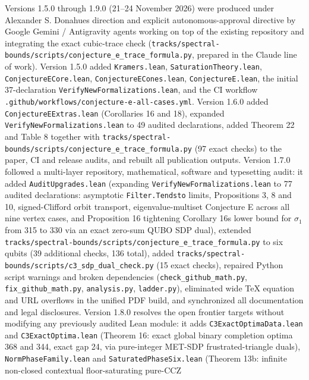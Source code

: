 \documentclass[11pt,a4paper]{article}
\begin{document}
Versions 1.5.0 through 1.9.0 (21--24 November 2026) were produced under Alexander S. Donahue\textquotesingle s direction and
explicit autonomous-approval directive by Google Gemini / Antigravity agents working on top of the
existing repository and integrating the exact cubic-trace check (\nolinkurl{tracks/spectral-bounds/scripts/conjecture_e_trace_formula.py},
prepared in the Claude line of work). Version 1.5.0 added \texttt{Kramers.lean}, \nolinkurl{SaturationTheory.lean},
\nolinkurl{ConjectureECore.lean}, \nolinkurl{ConjectureECones.lean}, \texttt{ConjectureE.lean}, the initial 37-declaration
\nolinkurl{VerifyNewFormalizations.lean}, and the CI workflow \nolinkurl{.github/workflows/conjecture-e-all-cases.yml}.
Version 1.6.0 added \nolinkurl{ConjectureEExtras.lean} (Corollaries 16 and 18), expanded
\nolinkurl{VerifyNewFormalizations.lean} to 49 audited declarations, added Theorem 22 and Table 8 together with
\nolinkurl{tracks/spectral-bounds/scripts/conjecture_e_trace_formula.py} (97 exact checks) to the paper, CI and release audits, and
rebuilt all publication outputs. Version 1.7.0 followed a multi-layer repository, mathematical, software
and typesetting audit: it added \nolinkurl{AuditUpgrades.lean} (expanding \nolinkurl{VerifyNewFormalizations.lean} to 77
audited declarations: asymptotic \texttt{Filter.Tendsto} limits, Propositions 3, 8 and 10, signed-Clifford orbit
transport, eigenvalue-multiset Conjecture E across all nine vertex cases, and Proposition 16\textquotesingle{} tightening
Corollary 16\textquotesingle s lower bound for \(\sigma_1\) from 315 to 330 via an exact zero-sum QUBO SDP dual), extended
\nolinkurl{tracks/spectral-bounds/scripts/conjecture_e_trace_formula.py} to six qubits (39 additional checks, 136 total), added
\nolinkurl{tracks/spectral-bounds/scripts/c3_sdp_dual_check.py} (15 exact checks), repaired Python script warnings and broken dependencies
(\nolinkurl{check_github_math.py}, \nolinkurl{fix_github_math.py}, \texttt{analysis.py}, \texttt{ladder.py}), eliminated wide TeX equation
and URL overflows in the unified PDF build, and synchronized all documentation and legal disclosures.
Version 1.8.0 resolves the open frontier targets without modifying any previously audited Lean module:
it adds \nolinkurl{C3ExactOptimaData.lean} and \nolinkurl{C3ExactOptima.lean} (Theorem 16\textquotesingle\textquotesingle: exact global binary completion
optima 368 and 344, exact gap 24, via pure-integer MET-SDP frustrated-triangle duals), \nolinkurl{NormPhaseFamily.lean}
and \nolinkurl{SaturatedPhaseSix.lean} (Theorem 13b: infinite non-closed contextual floor-saturating pure-CCZ
\end{document}
